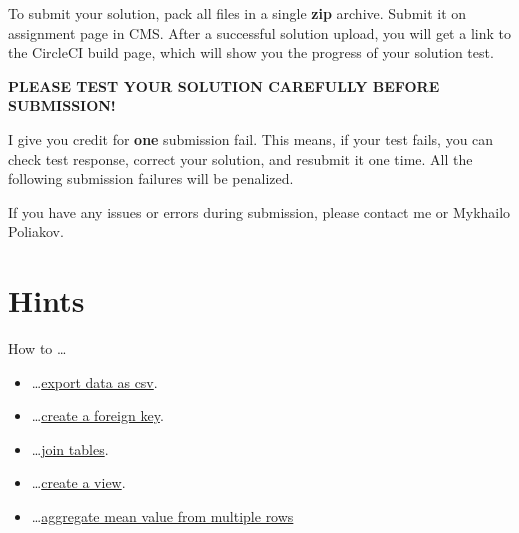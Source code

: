 \documentclass[12pt]{article}
\begin{document}
To submit your solution, pack all files in a single \textbf{zip} archive. 
Submit it on assignment page in CMS. After a successful solution upload, you will get a link to the CircleCI build page, which will show you the progress of your solution test.

\uppercase{\textbf{Please test your solution carefully before submission!}}

I give you credit for \textbf{one} submission fail. This means, if your test fails, you can check test response, correct your solution, and resubmit it one time. All the following submission failures will be penalized.

If you have any issues or errors during submission, please contact me or Mykhailo Poliakov.

\clearpage

\section*{Hints}
How to \dots
\begin{itemize}
\item \dots \href{https://dev.mysql.com/doc/workbench/en/wb-admin-export-import-table.html}{export data as csv}.

\item \dots \href{https://dev.mysql.com/doc/refman/8.0/en/create-table-foreign-keys.html}{create a foreign key}.

\item \dots \href{https://www.w3schools.com/sql/sql_join.asp}{join tables}.

\item \dots \href{https://dev.mysql.com/doc/refman/8.0/en/create-view.html}{create a view}.

\item \dots \href{http://www.mysqltutorial.org/mysql-aggregate-functions.aspx}{aggregate mean value from multiple rows}

\end{itemize}
\end{document}
